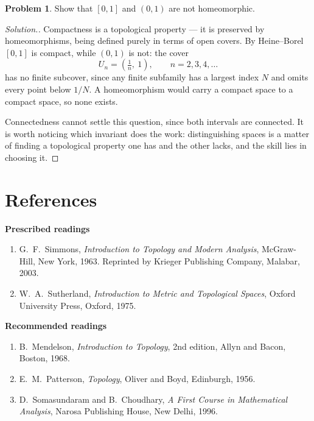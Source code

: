 \documentclass[11pt,a4paper]{article}
\theoremstyle{definition}
\newtheorem{problemx}{Problem}[subsection]
\newenvironment{problem}{\begin{problemx}}{\end{problemx}}
\newenvironment{solution}
  {\renewcommand{\qedsymbol}{}\begin{proof}[\textit{Solution}.]}
  {\end{proof}}
\newcommand{\subhead}[1]{%
  \par\medskip\noindent\textbf{#1}\par\nobreak\smallskip}
\begin{document}
\begin{problem}
Show that $[0,1]$ and $(0,1)$ are not homeomorphic.
\end{problem}
\begin{solution}
Compactness is a topological property --- it is preserved by homeomorphisms,
being defined purely in terms of open covers. By Heine--Borel $[0,1]$ is
compact, while $(0,1)$ is not: the cover
$$U_n = \left(\tfrac1n,\ 1\right),\qquad n=2,3,4,\dots$$
has no finite subcover, since any finite subfamily has a largest index $N$ and
omits every point below $1/N$. A homeomorphism would carry a compact space to a
compact space, so none exists.

Connectedness cannot settle this question, since both intervals are connected.
It is worth noticing which invariant does the work: distinguishing spaces is a
matter of finding a topological property one has and the other lacks, and the
skill lies in choosing it.
\end{solution}


\section*{References}

\subhead{Prescribed readings}
\begin{enumerate}
\item G.~F.~Simmons, \emph{Introduction to Topology and Modern Analysis}, McGraw-Hill, New York, 1963. Reprinted by Krieger Publishing Company, Malabar, 2003.
\item W.~A.~Sutherland, \emph{Introduction to Metric and Topological Spaces}, Oxford University Press, Oxford, 1975.
\end{enumerate}

\subhead{Recommended readings}
\begin{enumerate}
\item B.~Mendelson, \emph{Introduction to Topology}, 2nd edition, Allyn and Bacon, Boston, 1968.
\item E.~M.~Patterson, \emph{Topology}, Oliver and Boyd, Edinburgh, 1956.
\item D.~Somasundaram and B.~Choudhary, \emph{A First Course in Mathematical Analysis}, Narosa Publishing House, New Delhi, 1996.
\end{enumerate}
\end{document}
